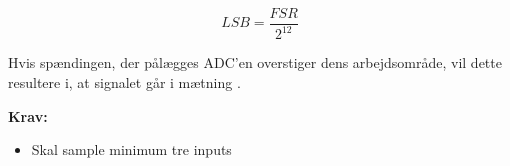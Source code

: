 \begin{equation} \label{equ:LSB}
LSB=\dfrac{FSR}{2^{12}}
\end{equation}

\noindent
Hvis spændingen, der pålægges ADC'en overstiger dens arbejdsområde, vil dette resultere i, at signalet går i mætning \citep{webster1998, wolf2004}.

\vspace{3mm}
\textbf{Krav:}
\begin{itemize}
\item Skal sample minimum tre inputs 
\end{itemize}

